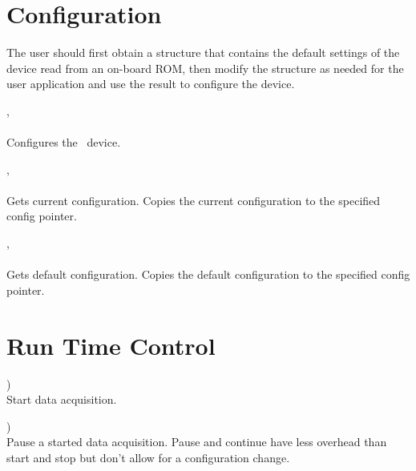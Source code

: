 	
	

	

	\section{Configuration}
		The user should first obtain a structure that contains the default settings of the device read from an on-board ROM, 
		then modify the structure as needed for the user application and use the result to configure the device.\par


		\deviceconfig, \\ \\
		Configures the \deviceName\ device.\par

		\deviceconfig, \\ \\
		Gets current configuration. Copies the current configuration to the specified config pointer.\par

		\deviceconfig, \\ \\
		Gets default configuration. Copies the default configuration to the specified config pointer.\par


	

	\section{Run Time Control}
		\device)\\
		Start data acquisition.\par

		\device)\\
		Pause a started data acquisition. 
		Pause and continue have less overhead than start and stop but don't allow for a configuration change.\par

